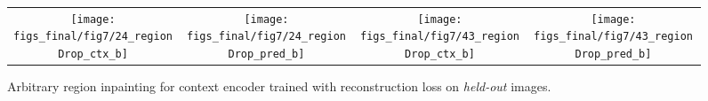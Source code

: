 \documentclass[10pt,twocolumn,letterpaper]{article}
\newcommand{\lblfig}[1]{\label{fig:#1}}
\begin{document}
\begin{figure}[b]
\vspace{-0.5em}
\centering
\begin{tabular}{c@{\hskip 1pt}c@{\hskip 4pt}c@{\hskip 1pt}c}
\texttt{[image: figs\_final/fig7/24\_regionDrop\_ctx\_b]} &
\texttt{[image: figs\_final/fig7/24\_regionDrop\_pred\_b]} &
\texttt{[image: figs\_final/fig7/43\_regionDrop\_ctx\_b]} &
\texttt{[image: figs\_final/fig7/43\_regionDrop\_pred\_b]}
\end{tabular}
\vspace{-0.5em}
\caption{Arbitrary region inpainting for context encoder trained with reconstruction loss on \textit{held-out} images.}
\lblfig{arbitrary_inpaint}
\vspace{-0.5em}
\end{figure}

%
%
%
%
%
%
%
%
%

%
%
%
%
%
%
%

%
%
%
%
%
%
%
%
%
%

%
%
\end{document}
